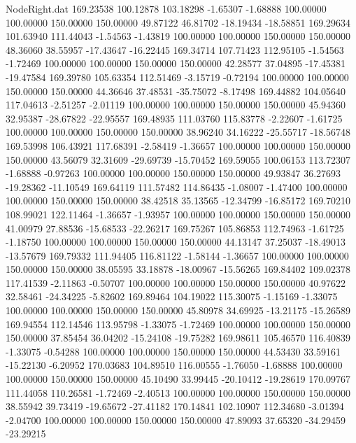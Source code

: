 \begin{filecontents}{NodeRight.dat}
 169.23538  100.12878  103.18298    -1.65307   -1.68888  100.00000  100.00000  150.00000  150.00000   49.87122   46.81702  -18.19434  -18.58851
 169.29634  101.63940  111.44043    -1.54563   -1.43819  100.00000  100.00000  150.00000  150.00000   48.36060   38.55957  -17.43647  -16.22445
 169.34714  107.71423  112.95105    -1.54563   -1.72469  100.00000  100.00000  150.00000  150.00000   42.28577   37.04895  -17.45381  -19.47584
 169.39780  105.63354  112.51469    -3.15719   -0.72194  100.00000  100.00000  150.00000  150.00000   44.36646   37.48531  -35.75072   -8.17498
 169.44882  104.05640  117.04613    -2.51257   -2.01119  100.00000  100.00000  150.00000  150.00000   45.94360   32.95387  -28.67822  -22.95557
 169.48935  111.03760  115.83778    -2.22607   -1.61725  100.00000  100.00000  150.00000  150.00000   38.96240   34.16222  -25.55717  -18.56748
 169.53998  106.43921  117.68391    -2.58419   -1.36657  100.00000  100.00000  150.00000  150.00000   43.56079   32.31609  -29.69739  -15.70452
 169.59055  100.06153  113.72307    -1.68888   -0.97263  100.00000  100.00000  150.00000  150.00000   49.93847   36.27693  -19.28362  -11.10549
 169.64119  111.57482  114.86435    -1.08007   -1.47400  100.00000  100.00000  150.00000  150.00000   38.42518   35.13565  -12.34799  -16.85172
 169.70210  108.99021  122.11464    -1.36657   -1.93957  100.00000  100.00000  150.00000  150.00000   41.00979   27.88536  -15.68533  -22.26217
 169.75267  105.86853  112.74963    -1.61725   -1.18750  100.00000  100.00000  150.00000  150.00000   44.13147   37.25037  -18.49013  -13.57679
 169.79332  111.94405  116.81122    -1.58144   -1.36657  100.00000  100.00000  150.00000  150.00000   38.05595   33.18878  -18.00967  -15.56265
 169.84402  109.02378  117.41539    -2.11863   -0.50707  100.00000  100.00000  150.00000  150.00000   40.97622   32.58461  -24.34225   -5.82602
 169.89464  104.19022  115.30075    -1.15169   -1.33075  100.00000  100.00000  150.00000  150.00000   45.80978   34.69925  -13.21175  -15.26589
 169.94554  112.14546  113.95798    -1.33075   -1.72469  100.00000  100.00000  150.00000  150.00000   37.85454   36.04202  -15.24108  -19.75282
 169.98611  105.46570  116.40839    -1.33075   -0.54288  100.00000  100.00000  150.00000  150.00000   44.53430   33.59161  -15.22130   -6.20952
 170.03683  104.89510  116.00555    -1.76050   -1.68888  100.00000  100.00000  150.00000  150.00000   45.10490   33.99445  -20.10412  -19.28619
 170.09767  111.44058  110.26581    -1.72469   -2.40513  100.00000  100.00000  150.00000  150.00000   38.55942   39.73419  -19.65672  -27.41182
 170.14841  102.10907  112.34680    -3.01394   -2.04700  100.00000  100.00000  150.00000  150.00000   47.89093   37.65320  -34.29459  -23.29215

\end{filecontents}
